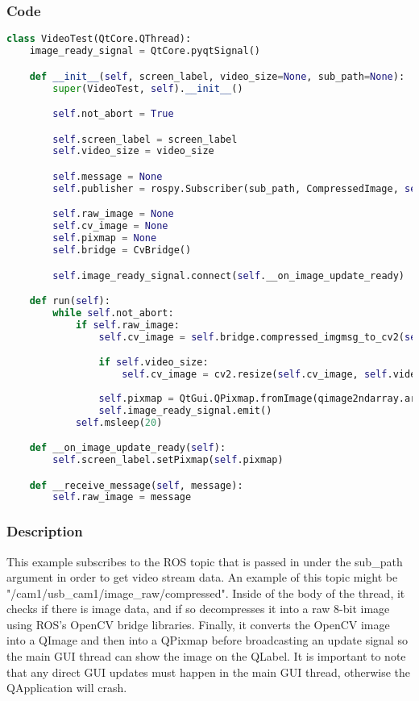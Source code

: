 \subsubsection{Code}
\begin{lstlisting}[language=python]
class VideoTest(QtCore.QThread):
    image_ready_signal = QtCore.pyqtSignal()

    def __init__(self, screen_label, video_size=None, sub_path=None):
        super(VideoTest, self).__init__()

        self.not_abort = True

        self.screen_label = screen_label
        self.video_size = video_size

        self.message = None
        self.publisher = rospy.Subscriber(sub_path, CompressedImage, self.__receive_message)

        self.raw_image = None
        self.cv_image = None
        self.pixmap = None
        self.bridge = CvBridge()

        self.image_ready_signal.connect(self.__on_image_update_ready)

    def run(self):
        while self.not_abort:
            if self.raw_image:
                self.cv_image = self.bridge.compressed_imgmsg_to_cv2(self.raw_image, "rgb8")

                if self.video_size:
                    self.cv_image = cv2.resize(self.cv_image, self.video_size)
                    
                self.pixmap = QtGui.QPixmap.fromImage(qimage2ndarray.array2qimage(self.cv_image))
                self.image_ready_signal.emit()
            self.msleep(20)

    def __on_image_update_ready(self):
        self.screen_label.setPixmap(self.pixmap)

    def __receive_message(self, message):
        self.raw_image = message
\end{lstlisting}
\subsubsection{Description}
This example subscribes to the ROS topic that is passed in under the sub\_path argument in order to get video stream data.
An example of this topic might be "/cam1/usb\_cam1/image\_raw/compressed".
Inside of the body of the thread, it checks if there is image data, and if so decompresses it into a raw 8-bit image using ROS's OpenCV bridge libraries.
Finally, it converts the OpenCV image into a QImage and then into a QPixmap before broadcasting an update signal so the main GUI thread can show the image on the QLabel.
It is important to note that any direct GUI updates must happen in the main GUI thread, otherwise the QApplication will crash.

